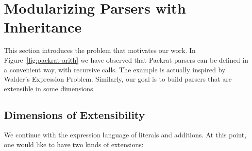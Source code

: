 \section{Modularizing Parsers with Inheritance}\label{sec:inheritance}

This section introduces the problem that motivates our work. In Figure~\ref{fig:packrat-arith} we have observed
that Packrat parsers can be defined in a convenient way, with recursive calls. The example is actually inspired
by Walder's Expression Problem. Similarly, our goal is to build parsers that are extensible in some dimensions.

\subsection{Dimensions of Extensibility}
We continue with the expression language of literals and additions. At this point,
one would like to have two kinds of extensions:

%

\begin{comment}
Basically, \name consists of four parts: underlying parsing technique, delegation mechanism encoded by open recursion, Object Algebras, and glue code of new combinators and utility functions. We start from Section \ref{subsec:overview-parsing}, which discusses the choice of parsing technique and how it affects modularity of parsers. Section \ref{subsec:overview-problem} demonstrates the goal of extending parsers together with ASTs in a semantic modular way, with both separate compilation and type-safe code reuse. Then we will see traditional parser combinators fail to achieve it because of hard-coded recursive calls. In Section \ref{subsec:overview-delegation}, we show how delegation can solve this problem and allow us to build extensible parsers. Finally, Section \ref{subsec:overview-oa} gives examples of using Object Algebras for more extensibility, including extension of operations and parsing multiple sorts of syntax.\haoyuan{TODO}
\end{comment}

